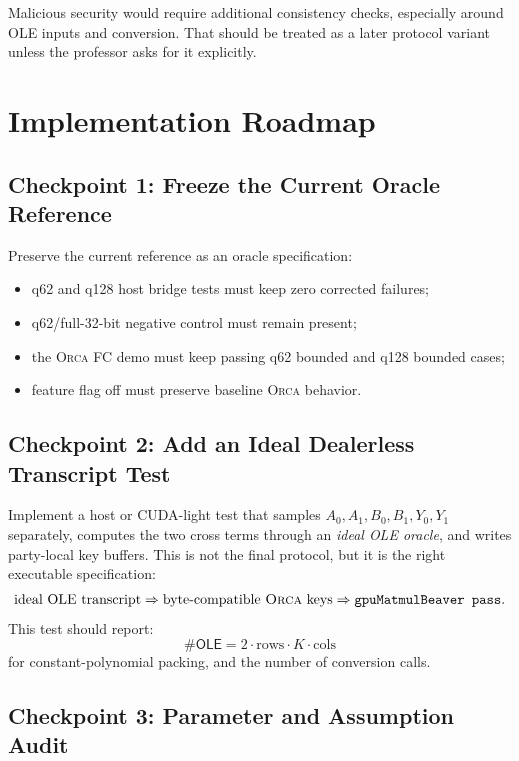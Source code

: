 \documentclass[11pt]{article}
\newcommand{\Orca}{\textsc{Orca}}
\newcommand{\OLE}{\mathsf{OLE}}
\begin{document}
Malicious security would require additional consistency checks, especially
around OLE inputs and conversion. That should be treated as a later protocol
variant unless the professor asks for it explicitly.

\section{Implementation Roadmap}

\subsection*{Checkpoint 1: Freeze the Current Oracle Reference}

Preserve the current reference as an oracle specification:
\begin{itemize}[leftmargin=*]
  \item q62 and q128 host bridge tests must keep zero corrected failures;
  \item q62/full-32-bit negative control must remain present;
  \item the \Orca{} FC demo must keep passing q62 bounded and q128 bounded
  cases;
  \item feature flag off must preserve baseline \Orca{} behavior.
\end{itemize}

\subsection*{Checkpoint 2: Add an Ideal Dealerless Transcript Test}

Implement a host or CUDA-light test that samples \(A_0,A_1,B_0,B_1,Y_0,Y_1\)
separately, computes the two cross terms through an \emph{ideal OLE oracle},
and writes party-local key buffers. This is not the final protocol, but it is
the right executable specification:
\[
  \text{ideal OLE transcript} \Rightarrow
  \text{byte-compatible \Orca{} keys} \Rightarrow
  \texttt{gpuMatmulBeaver pass}.
\]
This test should report:
\[
  \#\OLE = 2\cdot \text{rows}\cdot K\cdot \text{cols}
\]
for constant-polynomial packing, and the number of conversion calls.

\subsection*{Checkpoint 3: Parameter and Assumption Audit}
\end{document}
